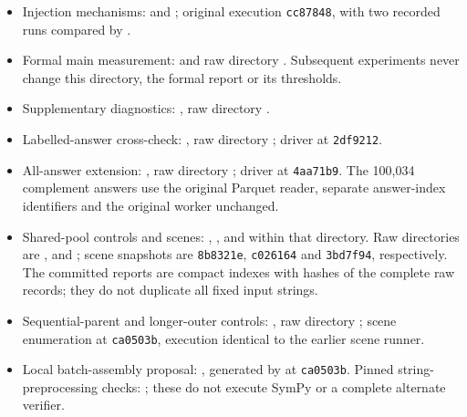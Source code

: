 \documentclass[10pt,a4paper]{article}
\begin{document}
\begin{itemize}[leftmargin=*]
\item Injection mechanisms:  and
      ; original execution \texttt{cc87848},
      with two recorded runs compared by .
\item Formal main measurement:  and
      raw directory . Subsequent experiments
      never change this directory, the formal report or its thresholds.
\item Supplementary diagnostics: ,
      raw directory .
\item Labelled-answer cross-check: ,
      raw directory ; driver at \texttt{2df9212}.
\item All-answer extension: , raw directory
      ; driver at \texttt{4aa71b9}.
      The 100,034 complement answers use the original Parquet reader,
      separate answer-index identifiers and the original worker unchanged.
\item Shared-pool controls and scenes: ,
      ,  and
       within that directory. Raw directories are
      ,  and
      ; scene snapshots are \texttt{8b8321e},
      \texttt{c026164} and \texttt{3bd7f94}, respectively. The committed
      reports are compact indexes with hashes of the complete raw records;
      they do not duplicate all fixed input strings.
\item Sequential-parent and longer-outer controls:
      , raw directory
      ; scene enumeration at
      \texttt{ca0503b}, execution identical to the earlier scene runner.
\item Local batch-assembly proposal: ,
      generated by  at \texttt{ca0503b}.
      Pinned string-preprocessing checks:
      ; these do not execute
      SymPy or a complete alternate verifier.
\end{itemize}
\end{document}
